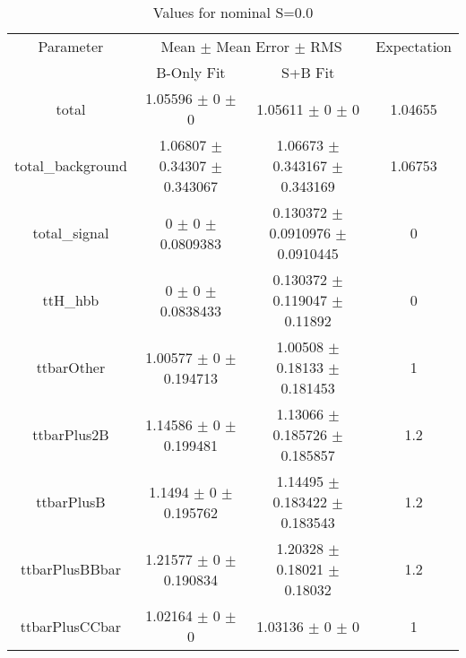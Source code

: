 \begin{table}
\centering
\caption{Values for nominal S=0.0}
\begin{tabular}{cccc}
\toprule
Parameter & \multicolumn{2}{c}{Mean $\pm$ Mean Error $\pm$ RMS} & Expectation\\
 & B-Only Fit & S+B Fit & \\
\midrule
total & \num{1.05596} $\pm$ \num{0} $\pm$ \num{0} & \num{1.05611} $\pm$ \num{0} $\pm$ \num{0} & \num{1.04655}\\
total\_background & \num{1.06807} $\pm$ \num{0.34307} $\pm$ \num{0.343067} & \num{1.06673} $\pm$ \num{0.343167} $\pm$ \num{0.343169} & \num{1.06753}\\
total\_signal & \num{0} $\pm$ \num{0} $\pm$ \num{0.0809383} & \num{0.130372} $\pm$ \num{0.0910976} $\pm$ \num{0.0910445} & \num{0}\\
ttH\_hbb & \num{0} $\pm$ \num{0} $\pm$ \num{0.0838433} & \num{0.130372} $\pm$ \num{0.119047} $\pm$ \num{0.11892} & \num{0}\\
ttbarOther & \num{1.00577} $\pm$ \num{0} $\pm$ \num{0.194713} & \num{1.00508} $\pm$ \num{0.18133} $\pm$ \num{0.181453} & \num{1}\\
ttbarPlus2B & \num{1.14586} $\pm$ \num{0} $\pm$ \num{0.199481} & \num{1.13066} $\pm$ \num{0.185726} $\pm$ \num{0.185857} & \num{1.2}\\
ttbarPlusB & \num{1.1494} $\pm$ \num{0} $\pm$ \num{0.195762} & \num{1.14495} $\pm$ \num{0.183422} $\pm$ \num{0.183543} & \num{1.2}\\
ttbarPlusBBbar & \num{1.21577} $\pm$ \num{0} $\pm$ \num{0.190834} & \num{1.20328} $\pm$ \num{0.18021} $\pm$ \num{0.18032} & \num{1.2}\\
ttbarPlusCCbar & \num{1.02164} $\pm$ \num{0} $\pm$ \num{0} & \num{1.03136} $\pm$ \num{0} $\pm$ \num{0} & \num{1}\\
\bottomrule
\end{tabular}
\end{table}